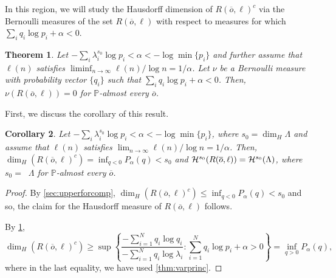 \documentclass[12pt,]{article}
\newtheorem{theorem}{Theorem}[section]
\newtheorem{corollary}[theorem]{Corollary}
\theoremstyle{definition}
\theoremstyle{remark}
\renewcommand{\Bbb}[1]{\mathbb{#1}}
\newcommand{\bbP}{{\Bbb P}}
\newcommand{\cH}{{\cal H}}
\newcommand{\0}{\mathbf{0}}
\newcommand{\bo}{{\overline o}}
\DeclareMathOperator{\dimh}{\dim_H}
\begin{document}
In this region, we will study the Hausdorff dimension of $R(\bo,\ell)^c$ via the Bernoulli measures
of the set $R(\bo,\ell)$ with respect to measures for which $\sum_iq_i\log p_i+\alpha<0$.

\begin{theorem}\label{thm:berR0}
  Let $-\sum_i\lambda_i^{s_0}\log p_i<\alpha<-\log\min\{p_i\}$ and further assume that $\ell(n)$ satisfies
  $\liminf_{n\to\infty}\ell(n)/\log n = 1/\alpha$. Let $\nu$ be a Bernoulli measure with probability
  vector $\{q_i\}$ such that $\sum_iq_i\log p_i+\alpha<0$. Then, $\nu(R(\bo,\ell)) =0$ for
  $\bbP$-almost every $\bo$.
\end{theorem}

First, we discuss the corollary of this result.

\begin{corollary}\label{thm:notfullregion}
  Let $-\sum_i\lambda_i^{s_0}\log p_i<\alpha<-\log\min\{p_i\}$, where $s_0=\dim_H\Lambda$ and assume
  that $\ell(n)$ satisfies
  $\lim_{n\to\infty}\ell(n)/\log n = 1/\alpha$. Then, $\dim_H(R(\bo,\ell)^c)
  =\inf_{q<0}P_\alpha(q)<s_0$ and $\cH^{s_0}(R(\bo,\ell))=\cH^{s_0}(\Lambda)$, where $s_0 = \dimh
  \Lambda$ for $\bbP$-almost every $\bo$.
\end{corollary}

\begin{proof}
  By \cref{sec:upperforcomp}, $\dim_H(R(\bo,\ell)^c) \leq\inf_{q<0}P_\alpha(q)<s_0$ and so, the
  claim for the Hausdorff measure of $R(\bo,\ell)$ follows.

  By \cref{thm:berR0},
  $$
  \dim_H(R(\bo,\ell)^c)\geq\sup\left\{\frac{-\sum_{i=1}^Nq_i\log q_i}{-\sum_{i=1}^Nq_i\log\lambda_i}
  : \sum_{i=1}^Nq_i\log p_i+\alpha>0\right\}=\inf_{q>0}P_\alpha(q),
  $$
  where in the last equality, we have used \cref{thm:varprinc}.
\end{proof}
\end{document}
